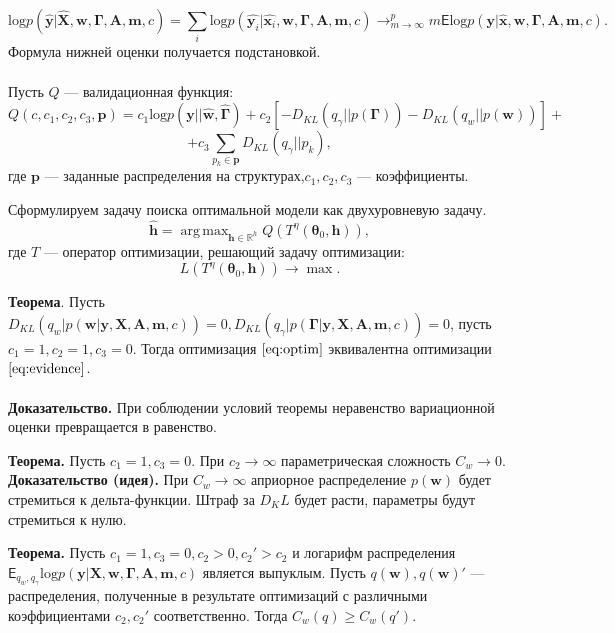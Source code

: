 \documentclass[12pt]{article}
\DeclareMathOperator*{\argmax}{arg\,max}
\begin{document}
\[
\text{log} p(\hat{\mathbf{y}}|\hat{\mathbf{X}},\mathbf{w}, \boldsymbol{\Gamma}, \mathbf{A},\mathbf{m}, c) = \sum_i \text{log} p(\hat{\mathbf{y}_i}|\hat{\mathbf{x}_i},\mathbf{w}, \boldsymbol{\Gamma}, \mathbf{A},\mathbf{m}, c) \to^p_{m \to \infty} m\mathsf{E}\text{log} p(\mathbf{y}|\hat{\mathbf{x}},\mathbf{w}, \boldsymbol{\Gamma}, \mathbf{A},\mathbf{m}, c).
\]
Формула нижней оценки получается подстановкой.
~\\~\\

Пусть $Q$ --- валидационная функция:
\[
    Q(c, c_1, c_2, c_3, \mathbf{p}) = c_1\text{log} p(\mathbf{y}||\hat{\mathbf{w}}, \hat{\boldsymbol{\Gamma}}) + c_2[-{D_{KL}}(q_\gamma||p(\boldsymbol{\Gamma})) - {D_{KL}}(q_{w}||p(\mathbf{w}))] + 
\]
\[
    + c_3\sum_{p_k \in \mathbf{p}}{D_{KL}}(q_\gamma||p_k),
\]
где $\mathbf{p}$ --- заданные распределения на структурах,$c_1,c_2,c_3$ --- коэффициенты.

Сформулируем задачу поиска оптимальной модели как двухуровневую задачу.
\begin{equation}
\label{eq:optim}
	\hat{\mathbf{h}} = \argmax_{\mathbf{h} \in \mathbb{R}^h} Q( T^\eta(\boldsymbol{\theta}_0, \mathbf{h})),
\end{equation}
где $T$ --- оператор оптимизации, решающий задачу оптимизации:
\[
    L(T^\eta(\boldsymbol{\theta}_0, \mathbf{h})) \to \max.
\]


\textbf{Теорема}. Пусть $D_{KL}(q_w|p(\mathbf{w}|\mathbf{y}, \mathbf{X}, \mathbf{A},\mathbf{m}, c)) = 0, D_{KL}(q_\gamma|p(\boldsymbol{\Gamma}|\mathbf{y}, \mathbf{X}, \mathbf{A},\mathbf{m}, c)) = 0$, пусть $c_1 = 1, c_2 = 1, c_3 = 0$. Тогда оптимизация $\eqref{eq:optim}$ эквивалентна оптимизации $\eqref{eq:evidence}$.\\~\\
\textbf{Доказательство.} При соблюдении условий теоремы неравенство вариационной оценки превращается в равенство. 

\textbf{Теорема.} Пусть $c_1 = 1, c_3 = 0$. При $c_2 \to \infty$ параметрическая сложность $C_w \to 0$.
\textbf{Доказательство (идея).} При $C_w \to \infty$ априорное распределение $p(\mathbf{w})$ будет стремиться к дельта-функции. Штраф за $D_KL$ будет расти, параметры будут стремиться к нулю.
   

\textbf{Теорема.} Пусть $c_1 = 1,  c_3 = 0, c_2 > 0, c_2' > c_2$ и  логарифм распределения $\mathsf{E}_{q_w,q_\gamma}\text{log} p(\mathbf{y}|\mathbf{X},\mathbf{w}, \boldsymbol{\Gamma}, \mathbf{A},\mathbf{m}, c)$ является выпуклым.
Пусть $q(\mathbf{w}), q(\mathbf{w})'$ --- распределения, полученные в результате оптимизаций с различными коэффициентами $c_2, c_2'$ соответственно. Тогда  $C_w(q) \geq C_w(q').$  
\end{document}
